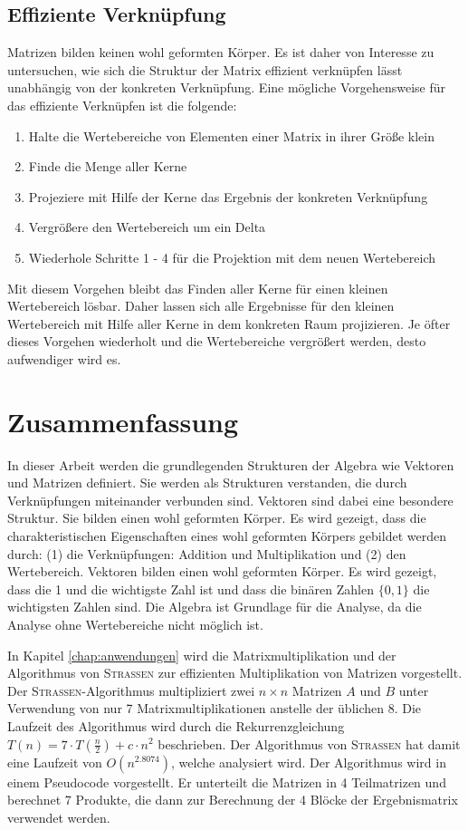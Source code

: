 \documentclass{report}
\numberwithin{equation}{section}
\begin{document}
\section{Effiziente Verknüpfung}
Matrizen bilden keinen wohl geformten Körper. Es ist daher von Interesse zu untersuchen, wie sich die Struktur der Matrix effizient verknüpfen lässt unabhängig von der konkreten Verknüpfung. Eine mögliche Vorgehensweise für das effiziente Verknüpfen ist die folgende: 
\begin{enumerate}
	\item Halte die Wertebereiche von Elementen einer Matrix in ihrer Größe klein
	\item Finde die Menge aller Kerne
	\item Projeziere mit Hilfe der Kerne das Ergebnis der konkreten Verknüpfung
	\item Vergrößere den Wertebereich um ein Delta
	\item Wiederhole Schritte 1 - 4 für die Projektion mit dem neuen Wertebereich
\end{enumerate}
Mit diesem Vorgehen bleibt das Finden aller Kerne für einen kleinen Wertebereich lösbar. Daher lassen sich alle Ergebnisse für den kleinen Wertebereich mit Hilfe aller Kerne in dem konkreten Raum projizieren. Je öfter dieses Vorgehen wiederholt und die Wertebereiche vergrößert werden, desto aufwendiger wird es.

\chapter{Zusammenfassung}
In dieser Arbeit werden die grundlegenden Strukturen der Algebra wie Vektoren und Matrizen definiert. Sie werden als Strukturen verstanden, die durch Verknüpfungen miteinander verbunden sind. Vektoren sind dabei eine besondere Struktur. Sie bilden einen wohl geformten Körper. Es wird gezeigt, dass die charakteristischen Eigenschaften eines wohl geformten Körpers gebildet werden durch: (1) die Verknüpfungen: Addition und Multiplikation und (2) den Wertebereich. Vektoren bilden einen wohl geformten Körper. Es wird gezeigt, dass die 1 und die wichtigste Zahl ist und dass die binären Zahlen $\{0, 1\}$ die wichtigsten Zahlen sind. Die Algebra ist Grundlage für die Analyse, da die Analyse ohne Wertebereiche nicht möglich ist.

In Kapitel \ref{chap:anwendungen} wird die Matrixmultiplikation und der Algorithmus von \textsc{Strassen} zur effizienten Multiplikation von Matrizen vorgestellt. Der \textsc{Strassen}-Algorithmus multipliziert zwei $n \times n$ Matrizen $A$ und $B$ unter Verwendung von nur 7 Matrixmultiplikationen anstelle der üblichen 8. Die Laufzeit des Algorithmus wird durch die Rekurrenzgleichung $T(n) = 7 \cdot T\left(\frac{n}{2}\right) + c \cdot n^2$ beschrieben. Der Algorithmus von \textsc{Strassen} hat damit eine Laufzeit von $O(n^{2.8074})$, welche analysiert wird. Der Algorithmus wird in einem Pseudocode vorgestellt. Er unterteilt die Matrizen in 4 Teilmatrizen und berechnet 7 Produkte, die dann zur Berechnung der 4 Blöcke der Ergebnismatrix verwendet werden.
\end{document}
